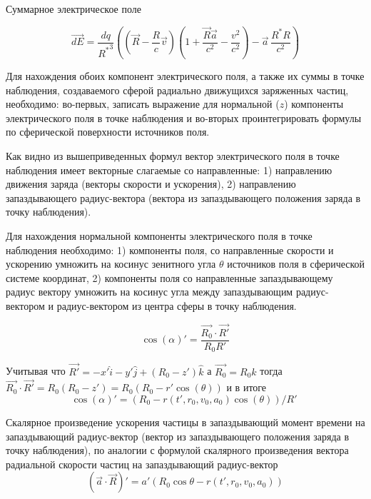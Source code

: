 \documentclass[12pt]{article}
\begin{document}
Суммарное электрическое поле

$$\vec{dE} = \frac{dq}{{{R}^{*}}^{3}}\left( \left(\vec{R}-\frac{R}{c}\vec{v} \right) \left(1 + \frac{\vec{R}\vec{a}}{c^2} - \frac{v^2}{c^2} \right) - \vec{a}\,\frac{{R}^{*}R}{c^2} \right)$$


Для нахождения обоих компонент электрического поля, а также их суммы в точке наблюдения, создаваемого сферой радиально движущихся заряженных частиц, необходимо: во-первых, записать выражение для нормальной ($z$) компоненты электрического поля в точке наблюдения и во-вторых проинтегрировать формулы по сферической поверхности источников поля.

Как видно из вышеприведенных формул вектор электрического поля в точке наблюдения имеет векторные слагаемые со направленные: 1) направлению движения заряда (векторы скорости и ускорения), 2) направлению запаздывающего радиус-вектора (вектора из запаздывающего положения заряда в точку наблюдения).

Для нахождения нормальной компоненты электрического поля в точке наблюдения необходимо: 1) компоненты поля, со направленные скорости и ускорению умножить на косинус зенитного угла $\theta$ источников поля в сферической системе координат, 2) компоненты поля со направленные запаздывающему радиус вектору умножить на косинус угла между запаздывающим радиус-вектором и радиус-вектором из центра сферы в точку наблюдения.

 $$\cos \left( \alpha  \right)'=\frac{\overrightarrow{{{R}_{0}}}\cdot \overrightarrow{R'}}{{{R}_{0}}R'}$$

Учитывая что $\overrightarrow{R'}=-x'\widehat{i}-y'\widehat{j}+\left( {{R}_{0}}-z' \right)\widehat{k}$ а  $\overrightarrow{{{R}_{0}}}={{R}_{0}}\widehat{k}$ тогда $\overrightarrow{{{R}_{0}}}\cdot \overrightarrow{R'}={{R}_{0}}\left( {{R}_{0}}-z' \right)={{R}_{0}}\left( {{R}_{0}}-r'\cos \left( \theta  \right) \right)$ и в итоге
	$$\cos \left( \alpha  \right)'={\left( {{R}_{0}}-r\left( t',{{r}_{0}},{{v}_{0}},{{a}_{0}} \right)\cos \left( \theta  \right) \right)}/{R'}\;$$

Скалярное произведение ускорения частицы в запаздывающий момент времени на запаздывающий радиус-вектор (вектор из запаздывающего положения заряда в точку наблюдения), по аналогии с формулой скалярного произведения вектора радиальной скорости частиц на запаздывающий радиус-вектор
	\[\left( \overrightarrow{a}\cdot \overrightarrow{R} \right)'=a'\left( {{R}_{0}}\cos \theta -r\left( t',{{r}_{0}},{{v}_{0}},{{a}_{0}} \right) \right)\] 	
\end{document}

